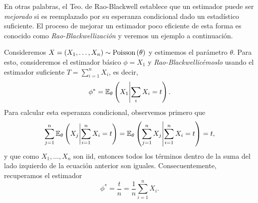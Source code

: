 En otras palabras, el Teo. de Rao-Blackwell establece que un estimador puede ser \textit{mejorado} si es reemplazado por su esperanza condicional dado un estadístico suficiente. El proceso de mejorar un estimador poco eficiente de esta forma es conocido como \textit{Rao-Blackwellización} y veremos un ejemplo a continuación.


\begin{example}
Consideremos $X = (X_1,\ldots,X_n)\sim \text{Poisson}\left(\theta\right)$ y estimemos el parámetro $\theta$. Para esto, consideremos el estimador básico $\phi = X_1$ y \textit{Rao-Blackwellicémoslo} usando el estimador suficiente $T=\sum_{i=1}^nX_i$, es decir, 
\begin{equation}
	\phi^* = \mathbb{E}_\theta \left(X_1\middle|\sum_i X_i=t\right).
\end{equation}
Para calcular esta esperanza condicional, observemos primero que  
\begin{equation}
	\sum_{j=1}^n\mathbb{E}_\theta \left(X_j\middle|\sum_{i=1}^n X_i=t\right) = \mathbb{E}_\theta \left(\sum_{j=1}^nX_j\middle|\sum_{i=1}^n X_i=t\right) = t,
\end{equation}
y que como $X_1,\ldots,X_n$ son iid, entonces todos los términos dentro de la suma del lado izquierdo de la ecuación anterior son iguales. Consecuentemente, recuperamos el estimador
\begin{equation}
 	\phi^* = \frac{t}{n} = \frac{1}{n}\sum_{i=1}^nX_i.
 \end{equation} 
\end{example}

